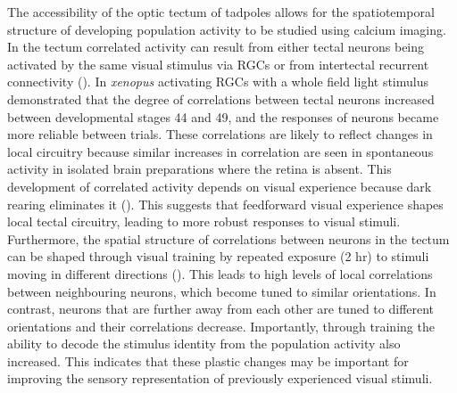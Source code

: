 The accessibility of the optic tectum of tadpoles allows for the spatiotemporal structure of developing population activity to be studied using calcium imaging. In the tectum correlated activity can result from either tectal neurons being activated by the same visual stimulus via RGCs or from intertectal recurrent connectivity (\cite{Pratt2008DevelopmentTectum}). In \textit{xenopus} activating RGCs with a whole field light stimulus demonstrated that the degree of correlations between tectal neurons increased between developmental stages 44 and 49, and the responses of neurons became more reliable between trials. These correlations are likely to reflect changes in local circuitry because similar increases in correlation are seen in spontaneous activity in isolated brain preparations where the retina is absent. This development of correlated activity depends on visual experience because dark rearing eliminates it (\cite{Xu2011VisualSystem}). This suggests that feedforward visual experience shapes local tectal circuitry, leading to more robust responses to visual stimuli. Furthermore, the spatial structure of correlations between neurons in the tectum can be shaped through visual training by repeated exposure (2 hr) to stimuli moving in different directions (\cite{Podgorski2012}). This leads to high levels of local correlations between neighbouring neurons, which become tuned to similar orientations. In contrast, neurons that are further away from each other are tuned to different orientations and their correlations decrease. Importantly, through training the ability to decode the stimulus identity from the population activity also increased. This indicates that these plastic changes may be important for improving the sensory representation of previously experienced visual stimuli.

